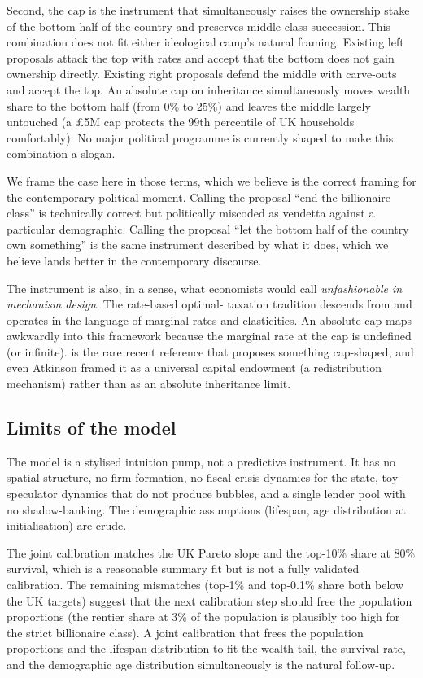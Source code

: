 \documentclass[11pt]{article}
\begin{document}
Second, the cap is the instrument that simultaneously raises the
ownership stake of the bottom half of the country and preserves
middle-class succession.  This combination does not fit either
ideological camp's natural framing.  Existing left proposals
attack the top with rates and accept that the bottom does not
gain ownership directly.  Existing right proposals defend the
middle with carve-outs and accept the top.  An absolute cap on
inheritance simultaneously moves wealth share to the bottom half
(from 0\% to 25\%) and leaves the middle largely untouched (a
\pounds 5M cap protects the 99th percentile of UK households
comfortably).  No major political programme is currently shaped to
make this combination a slogan.

We frame the case here in those terms, which we believe is the
correct framing for the contemporary political moment.  Calling
the proposal ``end the billionaire class'' is technically correct
but politically miscoded as vendetta against a particular
demographic.  Calling the proposal ``let the bottom half of the
country own something'' is the same instrument described by what
it does, which we believe lands better in the contemporary
discourse.

The instrument is also, in a sense, what economists would call
\emph{unfashionable in mechanism design}.  The rate-based optimal-
taxation tradition descends from
\citet{piketty2013theory, farhi2010progressive, saez2018social}
and operates in the language of marginal rates and elasticities.
An absolute cap maps awkwardly into this framework because the
marginal rate at the cap is undefined (or infinite).
\citet{atkinson2015inequality} is the rare recent reference that
proposes something cap-shaped, and even Atkinson framed it as a
universal capital endowment (a redistribution mechanism) rather
than as an absolute inheritance limit.

\subsection{Limits of the model}

The model is a stylised intuition pump, not a predictive instrument.
It has no spatial structure, no firm formation, no fiscal-crisis
dynamics for the state, toy speculator dynamics that do not produce
bubbles, and a single lender pool with no shadow-banking.  The
demographic assumptions (lifespan, age distribution at
initialisation) are crude.

The joint calibration matches the UK Pareto slope and the top-10\%
share at 80\% survival, which is a reasonable summary fit but is
not a fully validated calibration.  The remaining mismatches
(top-1\% and top-0.1\% share both below the UK targets) suggest
that the next calibration step should free the population
proportions (the rentier share at 3\% of the population is
plausibly too high for the strict billionaire class).  A joint
calibration that frees the population proportions and the lifespan
distribution to fit the wealth tail, the survival rate, and the
demographic age distribution simultaneously is the natural follow-up.
\end{document}
